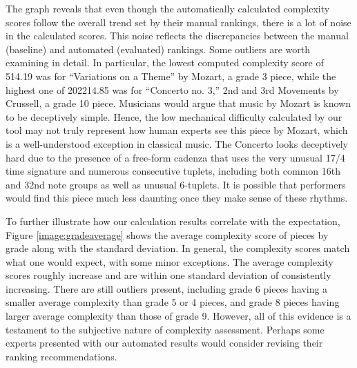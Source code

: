 \documentclass[10pt,preprint]{sigplanconf}
\begin{document}
The graph reveals that even though the automatically calculated complexity scores follow the overall trend set by their manual rankings, there is a lot of noise in the calculated scores. This noise reflects the discrepancies between the manual (baseline) and automated (evaluated) rankings. Some outliers are worth examining in detail. In particular, the lowest computed complexity score of 514.19 was for ``Variations on a Theme'' by Mozart, a grade 3 piece, while the highest one of 202214.85 was for ``Concerto no. 3,'' 2nd and 3rd Movements by Crussell, a grade 10 piece. Musicians would argue that music by Mozart is known to be deceptively simple. Hence, the low mechanical difficulty calculated by our tool may not truly represent how human experts see this piece by Mozart, which is a well-understood exception in classical music. The Concerto looks deceptively hard due to the presence of a free-form cadenza that uses the very unusual 17/4 time signature and numerous consecutive tuplets, including both common 16th and 32nd note groups as well as unusual 6-tuplets. It is possible that performers would find this piece much less daunting once they make sense of these rhythms. 


To further illustrate how our calculation results correlate with the expectation, Figure \ref{image:gradeaverage} shows the average complexity score of pieces by grade along with the standard deviation. In general, the complexity scores match what one would expect, with some minor exceptions. The average complexity scores roughly increase and are within one standard deviation of consistently increasing.  There are still outliers present, including grade 6 pieces having a smaller average complexity than grade 5 or 4 pieces, and grade 8 pieces having larger average complexity than those of grade 9. However, all of this evidence is a testament to the subjective nature of complexity assessment. Perhaps some experts presented with our automated results would consider revising their ranking recommendations.

\end{document}
